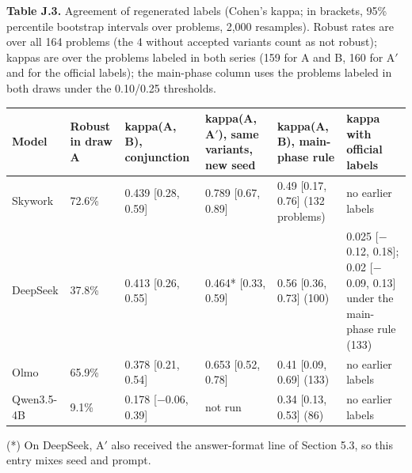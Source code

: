 \begin{center}\begin{minipage}{\linewidth}
\noindent\textbf{Table J.3.} Agreement of regenerated labels (Cohen's kappa; in brackets, 95\% percentile bootstrap intervals over problems, 2,000 resamples). Robust rates are over all 164 problems (the 4 without accepted variants count as not robust); kappas are over the problems labeled in both series (159 for A and B, 160 for A$'$ and for the official labels); the main-phase column uses the problems labeled in both draws under the 0.10/0.25 thresholds.\par\smallskip
{\footnotesize\setlength{\tabcolsep}{4pt}
\begin{tabular}{L{1.5cm}L{1.1cm}L{2.1cm}L{2.1cm}L{2.2cm}L{3.0cm}}
\toprule
\textbf{Model} & \textbf{Robust in draw A} & \textbf{kappa(A, B), conjunction} & \textbf{kappa(A, A$'$), same variants, new seed} & \textbf{kappa(A, B), main-phase rule} & \textbf{kappa with official labels} \\
\midrule
Skywork & 72.6\% & 0.439 [0.28, 0.59] & 0.789 [0.67, 0.89] & 0.49 [0.17, 0.76] (132 problems) & no earlier labels \\
DeepSeek & 37.8\% & 0.413 [0.26, 0.55] & 0.464* [0.33, 0.59] & 0.56 [0.36, 0.73] (100) & 0.025 [$-$0.12, 0.18]; 0.02 [$-$0.09, 0.13] under the main-phase rule (133) \\
Olmo & 65.9\% & 0.378 [0.21, 0.54] & 0.653 [0.52, 0.78] & 0.41 [0.09, 0.69] (133) & no earlier labels \\
Qwen3.5-4B & 9.1\% & 0.178 [$-$0.06, 0.39] & not run & 0.34 [0.13, 0.53] (86) & no earlier labels \\
\bottomrule
\end{tabular}
\par\smallskip\noindent (*) On DeepSeek, A$'$ also received the answer-format line of Section 5.3, so this entry mixes seed and prompt.
}
\end{minipage}\end{center}

